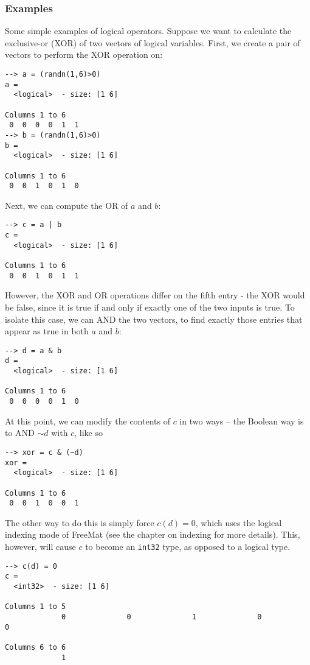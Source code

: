 \subsubsection{Examples}
Some simple examples of logical operators.  Suppose we want to calculate the exclusive-or (XOR) of two vectors of logical variables.  First, we create a pair of vectors to perform the XOR operation on:
\begin{verbatim}
--> a = (randn(1,6)>0)
a =
  <logical>  - size: [1 6]
  
Columns 1 to 6
 0  0  0  0  1  1
--> b = (randn(1,6)>0)
b =
  <logical>  - size: [1 6]
  
Columns 1 to 6
 0  0  1  0  1  0
\end{verbatim}
Next, we can compute the OR of $a$ and $b$:
\begin{verbatim}
--> c = a | b
c =
  <logical>  - size: [1 6]
  
Columns 1 to 6
 0  0  1  0  1  1
\end{verbatim}
However, the XOR and OR operations differ on the fifth entry - the XOR would be false, since it is true if and only if exactly one of the two inputs is true.  To isolate this case, we can AND the two vectors, to find exactly those entries that appear as true in both $a$ and $b$:
\begin{verbatim}
--> d = a & b
d =
  <logical>  - size: [1 6]
  
Columns 1 to 6
 0  0  0  0  1  0
\end{verbatim}
At this point, we can modify the contents of $c$ in two ways -- the Boolean way is to AND $\sim d$ with $c$, like so
\begin{verbatim}
--> xor = c & (~d)
xor =
  <logical>  - size: [1 6]
  
Columns 1 to 6
 0  0  1  0  0  1
\end{verbatim}
The other way to do this is simply force $c(d) = 0$, which uses the logical indexing mode of FreeMat (see the chapter on indexing for more details).  This, however, will cause $c$ to become an \verb|int32| type, as opposed to a logical type.
\begin{verbatim}
--> c(d) = 0
c =
  <int32>  - size: [1 6]
  
Columns 1 to 5
             0              0              1              0              0
  
Columns 6 to 6
             1
\end{verbatim}
